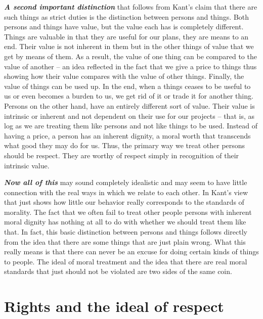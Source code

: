 \documentclass[
  12pt, openany]{book}
\theoremstyle{definition}
\theoremstyle{definition}
\theoremstyle{definition}
\theoremstyle{definition}
\theoremstyle{remark}
\begin{document}
\textbf{\emph{A second important distinction}} that follows from Kant's claim that there are such things as strict duties is the distinction between persons and things. Both persons and things have value, but the value each has is completely different. Things are valuable in that they are useful for our plans, they are means to an end. Their value is not inherent in them but in the other things of value that we get by means of them. As a result, the value of one thing can be compared to the value of another -- an idea reflected in the fact that we give a price to things thus showing how their value compares with the value of other things. Finally, the value of things can be used up. In the end, when a things ceases to be useful to us or even becomes a burden to us, we get rid of it or trade it for another thing. Persons on the other hand, have an entirely different sort of value. Their value is intrinsic or inherent and not dependent on their use for our projects -- that is, as log as we are treating them like persons and not like things to be used. Instead of having a price, a person has an inherent dignity, a moral worth that transcends what good they may do for us. Thus, the primary way we treat other persons should be respect. They are worthy of respect simply in recognition of their intrinsic value.

\textbf{\emph{Now all of this}} may sound completely idealistic and may seem to have little connection with the real ways in which we relate to each other. In Kant's view that just shows how little our behavior really corresponds to the standards of morality. The fact that we often fail to treat other people persons with inherent moral dignity has nothing at all to do with whether we should treat them like that. In fact, this basic distinction between persons and things follows directly from the idea that there are some things that are just plain wrong. What this really means is that there can never be an excuse for doing certain kinds of things to people. The ideal of moral treatment and the idea that there are real moral standards that just should not be violated are two sides of the same coin.

\hypertarget{rights-and-the-ideal-of-respect}{%
\section{Rights and the ideal of respect}\label{rights-and-the-ideal-of-respect}}
\end{document}
